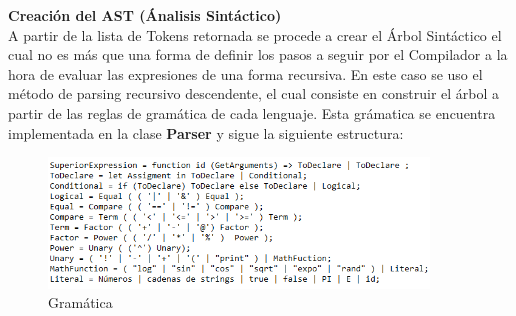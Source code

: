 \documentclass{article}
\begin{document}
\begin{flushleft}
\Large {\textbf{Creación del AST  (Ánalisis Sintáctico)}}\linebreak \\
\large {A partir de la lista de Tokens retornada se procede a crear el Árbol Sintáctico el cual no es más que una forma de definir los pasos a seguir por el Compilador a la hora de evaluar las expresiones de una forma recursiva. En este caso se uso el método de parsing recursivo descendente, el cual  consiste en construir el árbol a partir de las reglas de gramática de cada lenguaje.  Esta grámatica se encuentra implementada en la clase \textbf{Parser} y sigue la siguiente estructura:}\linebreak \\
\end{flushleft}

\begin{figure}
[!h]\label{Gramática}
\centering
\includegraphics[width =0.9\textwidth]{Gramática.png}
\caption{Gramática}
\end{figure}
\end{document}
